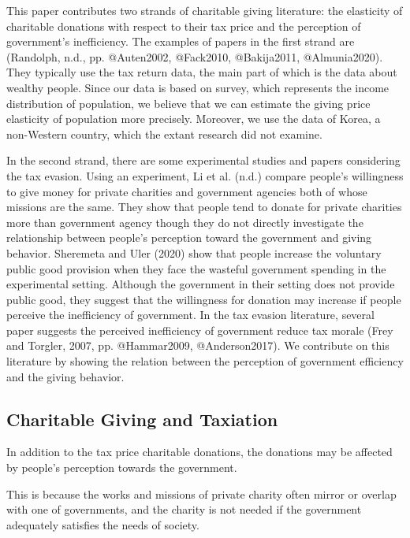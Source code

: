 \documentclass[ review  , 3p ]{elsarticle}
\begin{document}
  This paper contributes two strands of charitable giving literature: the elasticity of charitable donations with respect to their tax price and the perception of government's inefficiency. The examples of papers in the first strand are (Randolph, n.d., pp. @Auten2002, @Fack2010, @Bakija2011, @Almunia2020). They typically use the tax return data, the main part of which is the data about wealthy people. Since our data is based on survey, which represents the income distribution of population, we believe that we can estimate the giving price elasticity of population more precisely. Moreover, we use the data of Korea, a non-Western country, which the extant research did not examine.
  
  In the second strand, there are some experimental studies and papers considering the tax evasion. Using an experiment, Li et al. (n.d.) compare people's willingness to give money for private charities and government agencies both of whose missions are the same. They show that people tend to donate for private charities more than government agency though they do not directly investigate the relationship between people's perception toward the government and giving behavior. Sheremeta and Uler (2020) show that people increase the voluntary public good provision when they face the wasteful government spending in the experimental setting. Although the government in their setting does not provide public good, they suggest that the willingness for donation may increase if people perceive the inefficiency of government. In the tax evasion literature, several paper suggests the perceived inefficiency of government reduce tax morale (Frey and Torgler, 2007, pp. @Hammar2009, @Anderson2017). We contribute on this literature by showing the relation between the perception of government efficiency and the giving behavior.
  
  \hypertarget{charitable-giving-and-taxiation-1}{%
  \subsection{Charitable Giving and Taxiation}\label{charitable-giving-and-taxiation-1}}
  
  In addition to the tax price charitable donations, the donations may be affected by people's perception towards the government.
  
  This is because the works and missions of private charity often mirror or overlap with one of governments, and the charity is not needed if the government adequately satisfies the needs of society.
  
\end{document}
